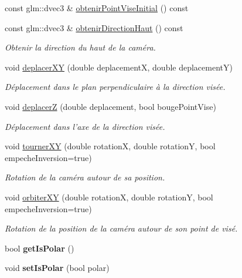 \begin{DoxyCompactItemize}
const glm\-::dvec3 \& \hyperlink{classvue_1_1_camera_af0a8e31fef378798c296cba418e88b50}{obtenir\-Point\-Vise\-Initial} () const 
\item 
const glm\-::dvec3 \& \hyperlink{classvue_1_1_camera_a51913d2a228cb4b90bb5eb72a4a15970}{obtenir\-Direction\-Haut} () const 
\begin{DoxyCompactList}\small\item\em Obtenir la direction du haut de la caméra. \end{DoxyCompactList}\item 
void \hyperlink{classvue_1_1_camera_aa08801e436ddf90400e632e402183618}{deplacer\-X\-Y} (double deplacement\-X, double deplacement\-Y)
\begin{DoxyCompactList}\small\item\em Déplacement dans le plan perpendiculaire à la direction visée. \end{DoxyCompactList}\item 
void \hyperlink{classvue_1_1_camera_a7e8dfbbf743a74bb0387e140fee09474}{deplacer\-Z} (double deplacement, bool bouge\-Point\-Vise)
\begin{DoxyCompactList}\small\item\em Déplacement dans l'axe de la direction visée. \end{DoxyCompactList}\item 
void \hyperlink{classvue_1_1_camera_a07795ebc629c68f8694b9ae08a53457f}{tourner\-X\-Y} (double rotation\-X, double rotation\-Y, bool empeche\-Inversion=true)
\begin{DoxyCompactList}\small\item\em Rotation de la caméra autour de sa position. \end{DoxyCompactList}\item 
void \hyperlink{classvue_1_1_camera_a5e88216d5d5b31e0e65be9674e5904ef}{orbiter\-X\-Y} (double rotation\-X, double rotation\-Y, bool empeche\-Inversion=true)
\begin{DoxyCompactList}\small\item\em Rotation de la position de la caméra autour de son point de visé. \end{DoxyCompactList}\item 
\hypertarget{classvue_1_1_camera_a7c06d18e1903e46d5ac164920806cfc6}{bool {\bfseries get\-Is\-Polar} ()}\label{classvue_1_1_camera_a7c06d18e1903e46d5ac164920806cfc6}

\item 
\hypertarget{classvue_1_1_camera_ab949982e2150d3bbc3d9409b0630ffde}{void {\bfseries set\-Is\-Polar} (bool polar)}\label{classvue_1_1_camera_ab949982e2150d3bbc3d9409b0630ffde}


\end{DoxyCompactItemize}
